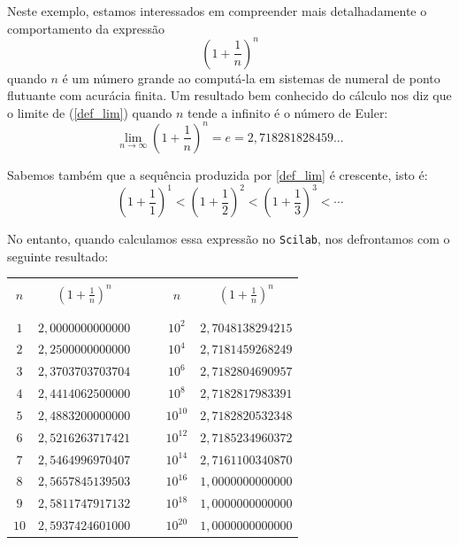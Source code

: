 \begin{ex}\label{ex:cancelamento_euler} Neste exemplo, estamos interessados em compreender mais detalhadamente o comportamento da expressão
\begin{equation*}
  \label{def_lim}\left(1+\frac{1}{n}\right)^n
\end{equation*}
quando $n$ é um número grande ao computá-la em sistemas de numeral de ponto flutuante com acurácia finita.
Um resultado bem conhecido do cálculo nos diz que o limite de (\ref{def_lim}) quando $n$ tende a infinito é o número de Euler:
\begin{equation*}\label{lim}
  \lim_{n\to \infty}\left(1+\frac{1}{n}\right)^n=e= 2,718281828459...
\end{equation*}

Sabemos também que a sequência produzida por \eqref{def_lim} é crescente, isto é:
$$\left(1+\frac{1}{1}\right)^1< \left(1+\frac{1}{2}\right)^2< \left(1+\frac{1}{3}\right)^3 < \cdots $$

No entanto, quando calculamos essa expressão no \verb+Scilab+, nos defrontamos com o seguinte resultado:
\begin{center}
\begin{tabular}{|c|c|c|c|c|}\hline &&&&\\[-0.3cm]
$n$ & $\left(1+\frac{1}{n}\right)^n$&$~~~~$&$n$ & $\left(1+\frac{1}{n}\right)^n$\\ &&&&\\[-0.3cm]\hline\\[-0.3cm]
$1$ & $2,0000000000000$ && $10^{2}$ & $2,7048138294215$ \\
$2$ & $2,2500000000000$ && $10^{4}$ & $2,7181459268249$ \\
$3$ & $2,3703703703704$ && $10^{6}$ & $2,7182804690957$ \\
$4$ & $2,4414062500000$ && $10^{8}$ & $2,7182817983391$ \\
$5$ & $2,4883200000000$ && $10^{10}$ & $2,7182820532348$ \\
$6$ & $2,5216263717421$ && $10^{12}$ & $2,7185234960372$ \\
$7$ & $2,5464996970407$ && $10^{14}$ & $2,7161100340870$ \\
$8$ & $2,5657845139503$ && $10^{16}$ & $1,0000000000000$ \\
$9$ & $2,5811747917132$ && $10^{18}$ & $1,0000000000000$ \\
$10$ & $2,5937424601000$ && $10^{20}$ & $1,0000000000000$ \\\hline
\end{tabular}  
\end{center}


\end{ex}
